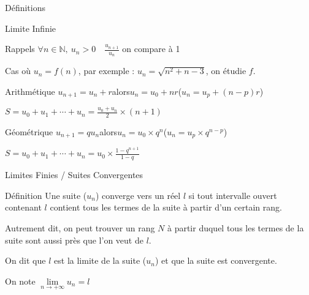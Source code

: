 \documentclass{cours}
\begin{document}
\begin{Gpartie}{Définitions}
\begin{Spartie}{Limite Infinie}
\begin{SSpartie}{Rappels}
                $\forall n\in\mathbb{N},\ u_n>0\quad\frac{u_{n+1}}{u_n}$ on compare à 1

                Cas où $u_n=f(n)$, par exemple : $u_n=\sqrt{n^2+n-3}$, on étudie $f$.
                \begin{SSSpartie}{Arithmétique} 
                    $u_{n+1}=u_n+r$\quad alors\quad $u_n=u_0+nr$\quad\big($u_n=u_p+(n-p)r$\big)

                    $S=u_0+u_1+\dotsb+u_n=\frac{u_0+u_n}{2}\times(n+1)$
                \end{SSSpartie}
                \begin{SSSpartie}{Géométrique} 
                    $u_{n+1}=qu_n$\quad alors\quad $u_n=u_0\times q^n$\quad\big($u_n=u_p\times q^{n-p}$\big)

                    $S=u_0+u_1+\dotsb+u_n=u_0\times\frac{1-q^{n+1}}{1-q}$
                \end{SSSpartie}
            \end{SSpartie}
        \end{Spartie}
        \begin{Spartie}{Limites Finies / Suites Convergentes} 
            \begin{SSpartie}{Définition} 
                Une suite ($u_n$) converge vers un réel $l$ si tout intervalle ouvert contenant $l$ contient tous les termes de la suite à partir d'un certain rang.

                Autrement dit, on peut trouver un rang $N$ à partir duquel tous les termes de la suite sont aussi près que l'on veut de $l$.

                On dit que $l$ est la limite de la suite ($u_n$) et que la suite est convergente.

                On note $\lim\limits_{n\to +\infty} u_n=l$


\end{SSpartie}
\end{Spartie}
\end{Gpartie}
\end{document}
